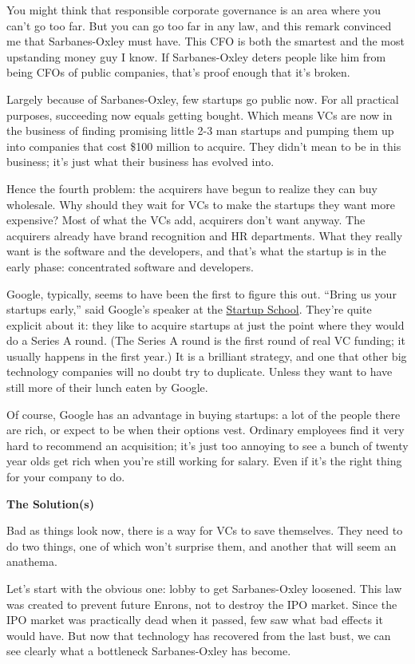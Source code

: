 \documentclass[12pt]{book}
\begin{document}
You might think that responsible corporate governance is an area where
you can't go too far. But you can go too far in any law, and this remark
convinced me that Sarbanes-Oxley must have. This CFO is both the
smartest and the most upstanding money guy I know. If Sarbanes-Oxley
deters people like him from being CFOs of public companies, that's proof
enough that it's broken.

Largely because of Sarbanes-Oxley, few startups go public now. For all
practical purposes, succeeding now equals getting bought. Which means
VCs are now in the business of finding promising little 2-3 man startups
and pumping them up into companies that cost \$100 million to acquire.
They didn't mean to be in this business; it's just what their business
has evolved into.

Hence the fourth problem: the acquirers have begun to realize they can
buy wholesale. Why should they wait for VCs to make the startups they
want more expensive? Most of what the VCs add, acquirers don't want
anyway. The acquirers already have brand recognition and HR departments.
What they really want is the software and the developers, and that's
what the startup is in the early phase: concentrated software and
developers.

Google, typically, seems to have been the first to figure this out.
``Bring us your startups early,'' said Google's speaker at the
\href{http://startupschool.org}{Startup School}. They're quite explicit
about it: they like to acquire startups at just the point where they
would do a Series A round. (The Series A round is the first round of
real VC funding; it usually happens in the first year.) It is a
brilliant strategy, and one that other big technology companies will no
doubt try to duplicate. Unless they want to have still more of their
lunch eaten by Google.

Of course, Google has an advantage in buying startups: a lot of the
people there are rich, or expect to be when their options vest. Ordinary
employees find it very hard to recommend an acquisition; it's just too
annoying to see a bunch of twenty year olds get rich when you're still
working for salary. Even if it's the right thing for your company to do.

\textbf{The Solution(s)}

Bad as things look now, there is a way for VCs to save themselves. They
need to do two things, one of which won't surprise them, and another
that will seem an anathema.

Let's start with the obvious one: lobby to get Sarbanes-Oxley loosened.
This law was created to prevent future Enrons, not to destroy the IPO
market. Since the IPO market was practically dead when it passed, few
saw what bad effects it would have. But now that technology has
recovered from the last bust, we can see clearly what a bottleneck
Sarbanes-Oxley has become.
\end{document}
